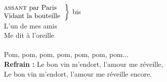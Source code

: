 
\\ 
$\left.\begin{tabular}{l}
\hspace{-0.4cm}
\textsc{assant} par Paris
\\
\hspace{-0.4cm}
Vidant la bouteille
\end{tabular}\right\rbrace$ bis
\\L'un de mes amis
\\Me dit à l'oreille
\\\\\hphantom{~~~~~~~~~~~~~~~~~~}Pom, pom, pom, pom, pom, pom, pom...
\\\textbf{Refrain :}\hphantom{~~~~} Le bon vin m'endort, l'amour me réveille,
\\\hphantom{~~~~~~~~~~~~~~~~~~}Le bon vin m'endort, l'amour me réveille encore.
